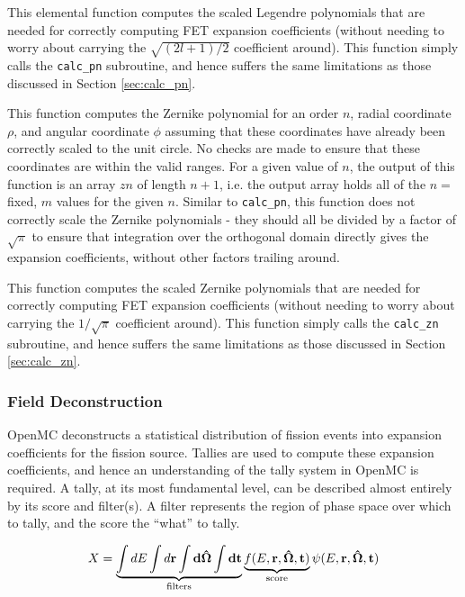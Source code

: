 \documentclass[10pt]{article}
\newcommand{\beq}{\begin{equation}}
\newcommand{\eeq}{\end{equation}}
\newcounter{subsubsubsection}[subsubsection]
\numberwithin{equation}{section} %
\begin{document}
This elemental function computes the scaled Legendre polynomials that are needed for correctly computing FET expansion coefficients (without needing to worry about carrying the \(\sqrt{(2l+1)/2}\) coefficient around). This function simply calls the {\tt calc\_pn} subroutine, and hence suffers the same limitations as those discussed in Section \ref{sec:calc_pn}. 

\label{sec:calc_zn}
This function computes the Zernike polynomial for an order \(n\), radial coordinate \(\rho\), and angular coordinate \(\phi\) assuming that these coordinates have already been correctly scaled to the unit circle. No checks are made to ensure that these coordinates are within the valid ranges. For a given value of \(n\), the output of this function is an array \(zn\) of length \(n+1\), i.e. the output array holds all of the \(n=\) fixed, \(m\) values for the given \(n\). Similar to {\tt calc\_pn}, this function does not correctly scale the Zernike polynomials - they should all be divided by a factor of \(\sqrt{\pi}\) to ensure that integration over the orthogonal domain directly gives the expansion coefficients, without other factors trailing around.

This function computes the scaled Zernike polynomials that are needed for correctly computing FET expansion coefficients (without needing to worry about carrying the \(1/\sqrt{\pi}\) coefficient around). This function simply calls the {\tt calc\_zn} subroutine, and hence suffers the same limitations as those discussed in Section \ref{sec:calc_zn}. 

\subsubsection{Field Deconstruction}
OpenMC deconstructs a statistical distribution of fission events into expansion coefficients for the fission source. Tallies are used to compute these expansion coefficients, and hence an understanding of the tally system in OpenMC is required. A tally, at its most fundamental level, can be described almost entirely by its score and filter(s). A filter represents the region of phase space over which to tally, and the score the ``what'' to tally. 

\beq
X=\underbrace{\int dE\int d\bf{r}\int d\hat{\Omega}\int dt}_{\textrm{filters}} \underbrace{f(E,\bf{r},\hat{\Omega},t)}_{\textrm{score}}\psi(E,\bf{r},\hat{\Omega},t)
\eeq
\end{document}
